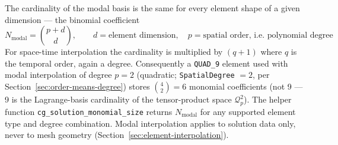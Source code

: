 \documentclass[11pt,letterpaper]{article}
\newcommand{\Qtp}{\mathcal{Q}^{2}_p}
\begin{document}
The cardinality of the modal basis is the
same for every element shape of a given dimension --- the binomial coefficient
\begin{equation}
  N_\mathrm{modal} = \binom{p+d}{d}, \qquad d = \text{element dimension}, \quad
  p = \text{spatial order, i.e.\ polynomial degree}
\end{equation}
For space-time interpolation the cardinality is multiplied by $(q+1)$ where $q$ is the temporal
order, again a degree.  Consequently a \texttt{QUAD\_9} element used with modal interpolation of
degree $p=2$ (quadratic; \texttt{SpatialDegree} $=2$, per
Section~\ref{sec:order-means-degree}) stores
$\binom{4}{2} = 6$ monomial coefficients (not 9 --- 9 is the Lagrange-basis cardinality of the
tensor-product space $\Qtp$).  The helper function \texttt{cg\_solution\_monomial\_size} returns
$N_\mathrm{modal}$ for any supported element type and degree combination.  Modal interpolation
applies to solution data only, never to mesh geometry
(Section~\ref{sec:element-interpolation}).
\end{document}
